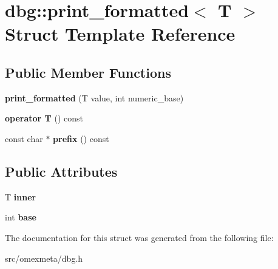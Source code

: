 \hypertarget{structdbg_1_1print__formatted}{}\section{dbg\+:\+:print\+\_\+formatted$<$ T $>$ Struct Template Reference}
\label{structdbg_1_1print__formatted}
\subsection*{Public Member Functions}
\begin{DoxyCompactItemize}
\item 
\mbox{\label{structdbg_1_1print__formatted_a77fef2b6aa871171bfefe58bab8a03fe}} 
{\bfseries print\+\_\+formatted} (T value, int numeric\+\_\+base)
\item 
\mbox{\label{structdbg_1_1print__formatted_ab6a7c4280acb807f5c5ab812f80a8aca}} 
{\bfseries operator T} () const
\item 
\mbox{\label{structdbg_1_1print__formatted_ab490d37d984d053177b6af3f94d0136e}} 
const char $\ast$ {\bfseries prefix} () const
\end{DoxyCompactItemize}
\subsection*{Public Attributes}
\begin{DoxyCompactItemize}
\item 
\mbox{\label{structdbg_1_1print__formatted_a080056e4f7af0c86ed46bc2ecb9c6f1e}} 
T {\bfseries inner}
\item 
\mbox{\label{structdbg_1_1print__formatted_af57ecb89743fca9b4cb1d0afd3c9d9f4}} 
int {\bfseries base}
\end{DoxyCompactItemize}


The documentation for this struct was generated from the following file\+:\begin{DoxyCompactItemize}
\item 
src/omexmeta/dbg.\+h\end{DoxyCompactItemize}
